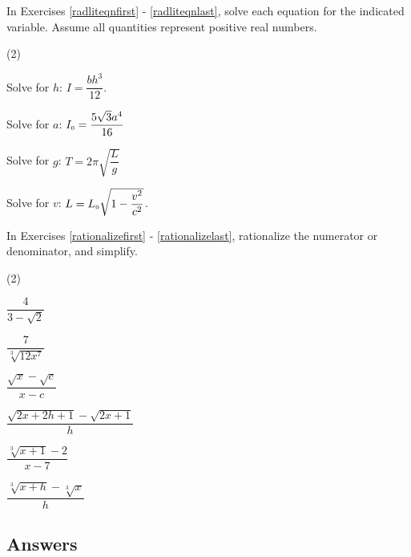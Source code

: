 In Exercises \ref{radliteqnfirst} - \ref{radliteqnlast}, solve each equation for the indicated variable.  Assume all quantities represent positive real numbers.

\begin{tasks}[resume](2)

\task Solve for $h$:  $I = \dfrac{bh^3}{12}$.  \label{radliteqnfirst}

\task Solve for $a$:  $I_{\text{\tiny $0$}} = \dfrac{5\sqrt{3} a^4}{16}$

\task Solve for $g$:  $T = 2\pi \sqrt{\dfrac{L}{g}}$

\task Solve for $v$:   $L = L_{\text{\tiny $0$}} \sqrt{1 - \dfrac{v^2}{c^2}}$.  \label{radliteqnlast}

\end{tasks}

In Exercises \ref{rationalizefirst} - \ref{rationalizelast}, rationalize the numerator or denominator, and simplify.


\begin{tasks}[resume](2)

\task   $\dfrac{4}{3 - \sqrt{2}}$  \label{rationalizefirst}

\task  $\dfrac{7}{\sqrt[3]{12x^7}}$

\task   $\dfrac{\sqrt{x} - \sqrt{c}}{x - c}$ 


\task  $\dfrac{\sqrt{2x+2h+1} - \sqrt{2x+1}}{h}$ 

\task  $\dfrac{\sqrt[3]{x+1} - 2}{x- 7}$                                          

\task  $\dfrac{\sqrt[3]{x+h} - \sqrt[3]{x}}{h}$  \label{rationalizelast}

\end{tasks}

\clearpage

\subsection{Answers}

